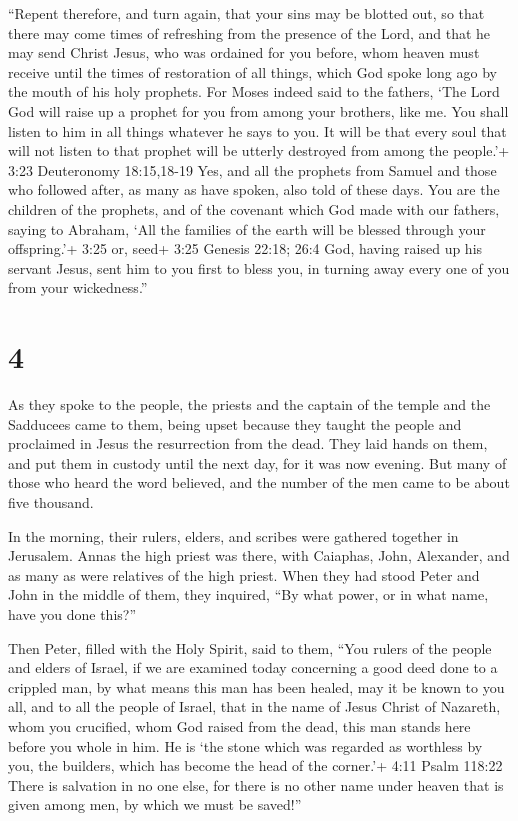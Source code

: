  ``Repent therefore, and turn again, that your sins may be
blotted out, so that there may come times of refreshing from the
presence of the Lord,  and that he may send Christ Jesus,
who was ordained for you before,  whom heaven must receive
until the times of restoration of all things, which God spoke long ago
by the mouth of his holy prophets.  For Moses indeed said
to the fathers, `The Lord God will raise up a prophet for you from among
your brothers, like me. You shall listen to him in all things whatever
he says to you.  It will be that every soul that will not
listen to that prophet will be utterly destroyed from among the
people.'+ 3:23 Deuteronomy 18:15,18-19  Yes, and all the
prophets from Samuel and those who followed after, as many as have
spoken, also told of these days.  You are the children of
the prophets, and of the covenant which God made with our fathers,
saying to Abraham, `All the families of the earth will be blessed
through your offspring.'+ 3:25 or, seed+ 3:25 Genesis 22:18; 26:4
 God, having raised up his servant Jesus, sent him to you
first to bless you, in turning away every one of you from your
wickedness.''

\hypertarget{section-3}{%
\section{4}\label{section-3}}

 As they spoke to the people, the priests and the captain of
the temple and the Sadducees came to them,  being upset
because they taught the people and proclaimed in Jesus the resurrection
from the dead.  They laid hands on them, and put them in
custody until the next day, for it was now evening.  But
many of those who heard the word believed, and the number of the men
came to be about five thousand.

 In the morning, their rulers, elders, and scribes were
gathered together in Jerusalem.  Annas the high priest was
there, with Caiaphas, John, Alexander, and as many as were relatives of
the high priest.  When they had stood Peter and John in the
middle of them, they inquired, ``By what power, or in what name, have
you done this?''

 Then Peter, filled with the Holy Spirit, said to them,
``You rulers of the people and elders of Israel,  if we are
examined today concerning a good deed done to a crippled man, by what
means this man has been healed,  may it be known to you
all, and to all the people of Israel, that in the name of Jesus Christ
of Nazareth, whom you crucified, whom God raised from the dead, this man
stands here before you whole in him.  He is `the stone
which was regarded as worthless by you, the builders, which has become
the head of the corner.'+ 4:11 Psalm 118:22  There is
salvation in no one else, for there is no other name under heaven that
is given among men, by which we must be saved!''

